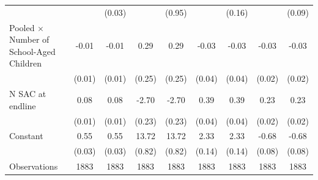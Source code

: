 \begin{table}[htbp]
\begin{tabular}{l*{8}{c}}
                    &                     &      (0.03)         &                     &      (0.95)         &                     &      (0.16)         &                     &      (0.09)         \\\addlinespace
Pooled $\times$ Number of School-Aged Children&       -0.01         &       -0.01         &        0.29         &        0.29         &       -0.03         &       -0.03         &       -0.03         &       -0.03         \\
                    &      (0.01)         &      (0.01)         &      (0.25)         &      (0.25)         &      (0.04)         &      (0.04)         &      (0.02)         &      (0.02)         \\\addlinespace
N SAC at endline    &        0.08\sym{***}&        0.08\sym{***}&       -2.70\sym{***}&       -2.70\sym{***}&        0.39\sym{***}&        0.39\sym{***}&        0.23\sym{***}&        0.23\sym{***}\\
                    &      (0.01)         &      (0.01)         &      (0.23)         &      (0.23)         &      (0.04)         &      (0.04)         &      (0.02)         &      (0.02)         \\\addlinespace
Constant            &        0.55\sym{***}&        0.55\sym{***}&       13.72\sym{***}&       13.72\sym{***}&        2.33\sym{***}&        2.33\sym{***}&       -0.68\sym{***}&       -0.68\sym{***}\\
                    &      (0.03)         &      (0.03)         &      (0.82)         &      (0.82)         &      (0.14)         &      (0.14)         &      (0.08)         &      (0.08)         \\
\midrule
Observations        &        1883         &        1883         &        1883         &        1883         &        1883         &        1883         &        1883         &        1883         \\
\bottomrule
\end{tabular}
\end{table}
